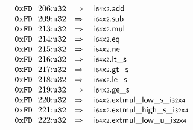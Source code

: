 $$\begin{array}[t]{@{}lrrl@{}l@{}l@{}l@{}}
& & | & \mathtt{0xFD}~~206{:}{\mathtt{u32}} & \quad\Rightarrow\quad{} & {\mathsf{i{\scriptstyle 64}}}{\mathsf{x}}{\mathsf{{\scriptstyle 2}}} {.} \mathsf{add} \\
& & | & \mathtt{0xFD}~~209{:}{\mathtt{u32}} & \quad\Rightarrow\quad{} & {\mathsf{i{\scriptstyle 64}}}{\mathsf{x}}{\mathsf{{\scriptstyle 2}}} {.} \mathsf{sub} \\
& & | & \mathtt{0xFD}~~213{:}{\mathtt{u32}} & \quad\Rightarrow\quad{} & {\mathsf{i{\scriptstyle 64}}}{\mathsf{x}}{\mathsf{{\scriptstyle 2}}} {.} \mathsf{mul} \\
& & | & \mathtt{0xFD}~~214{:}{\mathtt{u32}} & \quad\Rightarrow\quad{} & {\mathsf{i{\scriptstyle 64}}}{\mathsf{x}}{\mathsf{{\scriptstyle 2}}} {.} \mathsf{eq} \\
& & | & \mathtt{0xFD}~~215{:}{\mathtt{u32}} & \quad\Rightarrow\quad{} & {\mathsf{i{\scriptstyle 64}}}{\mathsf{x}}{\mathsf{{\scriptstyle 2}}} {.} \mathsf{ne} \\
& & | & \mathtt{0xFD}~~216{:}{\mathtt{u32}} & \quad\Rightarrow\quad{} & {\mathsf{i{\scriptstyle 64}}}{\mathsf{x}}{\mathsf{{\scriptstyle 2}}} {.} {\mathsf{lt}}{\mathsf{\_}}{\mathsf{s}} \\
& & | & \mathtt{0xFD}~~217{:}{\mathtt{u32}} & \quad\Rightarrow\quad{} & {\mathsf{i{\scriptstyle 64}}}{\mathsf{x}}{\mathsf{{\scriptstyle 2}}} {.} {\mathsf{gt}}{\mathsf{\_}}{\mathsf{s}} \\
& & | & \mathtt{0xFD}~~218{:}{\mathtt{u32}} & \quad\Rightarrow\quad{} & {\mathsf{i{\scriptstyle 64}}}{\mathsf{x}}{\mathsf{{\scriptstyle 2}}} {.} {\mathsf{le}}{\mathsf{\_}}{\mathsf{s}} \\
& & | & \mathtt{0xFD}~~219{:}{\mathtt{u32}} & \quad\Rightarrow\quad{} & {\mathsf{i{\scriptstyle 64}}}{\mathsf{x}}{\mathsf{{\scriptstyle 2}}} {.} {\mathsf{ge}}{\mathsf{\_}}{\mathsf{s}} \\
& & | & \mathtt{0xFD}~~220{:}{\mathtt{u32}} & \quad\Rightarrow\quad{} & {\mathsf{i{\scriptstyle 64}}}{\mathsf{x}}{\mathsf{{\scriptstyle 2}}} {.} {{\mathsf{extmul}}{\mathsf{\_}}{\mathsf{low}}{\mathsf{\_}}{\mathsf{s}}}{\mathsf{\_}}{{\mathsf{i{\scriptstyle 32}}}{\mathsf{x}}{\mathsf{{\scriptstyle 4}}}} \\
& & | & \mathtt{0xFD}~~221{:}{\mathtt{u32}} & \quad\Rightarrow\quad{} & {\mathsf{i{\scriptstyle 64}}}{\mathsf{x}}{\mathsf{{\scriptstyle 2}}} {.} {{\mathsf{extmul}}{\mathsf{\_}}{\mathsf{high}}{\mathsf{\_}}{\mathsf{s}}}{\mathsf{\_}}{{\mathsf{i{\scriptstyle 32}}}{\mathsf{x}}{\mathsf{{\scriptstyle 4}}}} \\
& & | & \mathtt{0xFD}~~222{:}{\mathtt{u32}} & \quad\Rightarrow\quad{} & {\mathsf{i{\scriptstyle 64}}}{\mathsf{x}}{\mathsf{{\scriptstyle 2}}} {.} {{\mathsf{extmul}}{\mathsf{\_}}{\mathsf{low}}{\mathsf{\_}}{\mathsf{u}}}{\mathsf{\_}}{{\mathsf{i{\scriptstyle 32}}}{\mathsf{x}}{\mathsf{{\scriptstyle 4}}}} \\

\end{array}$$
